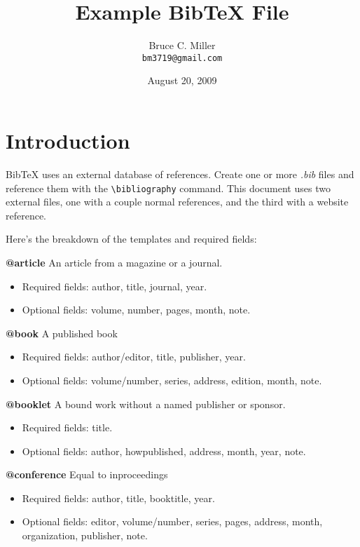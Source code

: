 \documentclass[a4paper,12pt]{article}
\begin{document}
\title{Example BibTeX File}
\author{Bruce C. Miller \\
{\tt bm3719@gmail.com}}
\date{August 20, 2009}
\maketitle

\section{Introduction}
BibTeX uses an external database of references.  Create one or more \emph{.bib}
files and reference them with the \texttt{\textbackslash bibliography}
command.  This document uses two external files, one with a couple normal
references, and the third with a website reference.

Here's the breakdown of the templates and required fields:

\textbf{@article}
An article from a magazine or a journal.
\begin{itemize}
\item Required fields: author, title, journal, year.
\item Optional fields: volume, number, pages, month, note.
\end{itemize}

\textbf{@book}
A published book
\begin{itemize}
\item Required fields: author/editor, title, publisher, year.
\item Optional fields: volume/number, series, address, edition, month, note.
\end{itemize}

\textbf{@booklet}
A bound work without a named publisher or sponsor.
\begin{itemize}
\item Required fields: title.
\item Optional fields: author, howpublished, address, month, year, note.
\end{itemize}

\textbf{@conference}
Equal to inproceedings
\begin{itemize}
\item Required fields: author, title, booktitle, year.
\item Optional fields: editor, volume/number, series, pages, address, month,
  organization, publisher, note.
\end{itemize}
\end{document}
